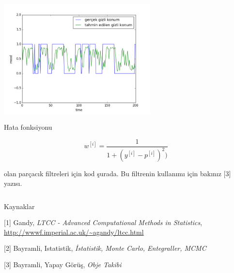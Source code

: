 \documentclass[12pt,fleqn]{article}\usepackage{../../common}
\begin{document}
\includegraphics[height=6cm]{tser_pf_01.png}

Hata fonksiyonu 

$$
w^{[i]} = \frac{1}{1 + (y^{[i]} - p^{[i]})^2  )}
$$

olan parçacık filtreleri için kod şurada. Bu filtrenin kullanımı için
bakınız [3] yazısı. 

\inputminted[fontsize=\footnotesize]{python}{PF.py}

Kaynaklar

[1] Gandy, {\em LTCC - Advanced Computational Methods in Statistics},
\url{http://wwwf.imperial.ac.uk/~agandy/ltcc.html}

[2] Bayramli, Istatistik, {\em İstatistik, Monte Carlo, Entegraller, MCMC}

[3] Bayramli, Yapay Görüş, {\em Obje Takibi}
\end{document}
